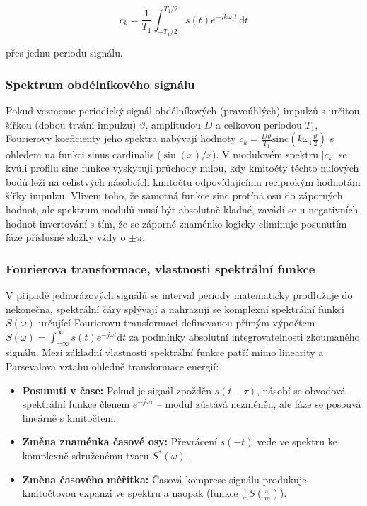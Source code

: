 		\begin{equation*}
			c_k = \frac{1}{T_1} \int_{-T_1/2}^{T_1/2} s(t) e^{-j k \omega_1 t} \, \text{d}t
		\end{equation*}
		
		přes jednu periodu signálu.
	\subsubsection{Spektrum obdélníkového signálu} 
		Pokud vezmeme periodický signál obdélníkových (pravoúhlých) impulzů s určitou šířkou (dobou trvání impulzu) $\vartheta$, amplitudou $D$ a celkovou periodou $T_1$, Fourierovy koeficienty jeho spektra nabývají hodnoty $c_k = \frac{D\vartheta}{T_1} \text{sinc}\left(k\omega_1\frac{\vartheta}{2}\right)$ s ohledem na funkci sinus cardinalis ($\sin(x)/x$). V modulovém spektru $|c_k|$ se kvůli profilu sinc funkce vyskytují průchody nulou, kdy kmitočty těchto nulových bodů leží na celistvých násobcích kmitočtu odpovídajícímu reciprokým hodnotám šířky impulzu. Vlivem toho, že samotná funkce sinc protíná osu do záporných hodnot, ale spektrum modulů musí být absolutně kladné, zavádí se u negativních hodnot invertování s tím, že se záporné znaménko logicky eliminuje posunutím fáze příslušné složky vždy o $\pm\pi$.
	\subsubsection{Fourierova transformace, vlastnosti spektrální funkce}
		V případě jednorázových signálů se interval periody matematicky prodlužuje do nekonečna, spektrální čáry splývají a nahrazují se komplexní spektrální funkcí $S(\omega)$ určující Fourierovu transformaci definovanou přímým výpočtem $S(\omega) = \int_{-\infty}^{\infty} s(t)e^{-j\omega t} \text{d}t$ za podmínky absolutní integrovatelnosti zkoumaného signálu. Mezi základní vlastnosti spektrální funkce patří mimo linearity a Parsevalova vztahu ohledně transformace energií:
	
		\begin{itemize}
			\item \textbf{Posunutí v čase:} Pokud je signál zpožděn $s(t - \tau)$, násobí se obvodová spektrální funkce členem $e^{-j\omega\tau}$ – modul zůstává nezměněn, ale fáze se posouvá lineárně s kmitočtem.
			\item \textbf{Změna znaménka časové osy:} Převrácení $s(-t)$ vede ve spektru ke komplexně sdruženému tvaru $S^*(\omega)$.
			\item \textbf{Změna časového měřítka:} Časová komprese signálu produkuje kmitočtovou expanzi ve spektru a naopak (funkce $\frac{1}{m} S\left(\frac{\omega}{m}\right)$).
		\end{itemize}
